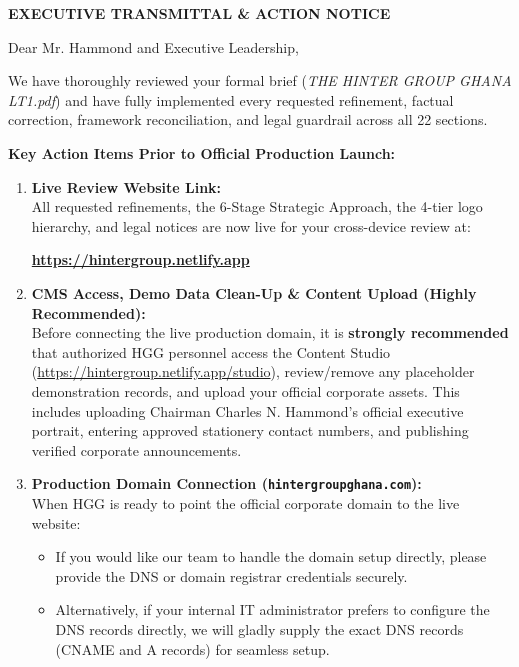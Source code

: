\documentclass[11pt,a4paper]{article}
\begin{document}
\begin{ExecutiveSummaryBox}
\begin{center}
    {\large\bfseries\color{HGGGoldLight}EXECUTIVE TRANSMITTAL \& ACTION NOTICE}
\end{center}
\vspace{0.1cm}
Dear Mr. Hammond and Executive Leadership,

We have thoroughly reviewed your formal brief (\textit{THE HINTER GROUP GHANA LT1.pdf}) and have fully implemented every requested refinement, factual correction, framework reconciliation, and legal guardrail across all 22 sections.

\vspace{0.15cm}
\textbf{\large\color{HGGGoldLight}Key Action Items Prior to Official Production Launch:}
\begin{enumerate}[leftmargin=*,label={\bfseries\color{HGGGoldLight}\arabic*.},itemsep=4pt]
    \item \textbf{Live Review Website Link:} \\
    All requested refinements, the 6-Stage Strategic Approach, the 4-tier logo hierarchy, and legal notices are now live for your cross-device review at:
    \begin{center}
        \textbf{\large\color{white}\url{https://hintergroup.netlify.app}}
    \end{center}
    
    \item \textbf{CMS Access, Demo Data Clean-Up \& Content Upload (Highly Recommended):} \\
    Before connecting the live production domain, it is \textbf{strongly recommended} that authorized HGG personnel access the Content Studio (\url{https://hintergroup.netlify.app/studio}), review/remove any placeholder demonstration records, and upload your official corporate assets. This includes uploading Chairman Charles N. Hammond's official executive portrait, entering approved stationery contact numbers, and publishing verified corporate announcements.
    
    \item \textbf{Production Domain Connection (\texttt{hintergroupghana.com}):} \\
    When HGG is ready to point the official corporate domain to the live website:
    \begin{itemize}[noitemsep]
        \item If you would like our team to handle the domain setup directly, please provide the DNS or domain registrar credentials securely.
        \item Alternatively, if your internal IT administrator prefers to configure the DNS records directly, we will gladly supply the exact DNS records (CNAME and A records) for seamless setup.
    \end{itemize}
\end{enumerate}


\end{ExecutiveSummaryBox}
\end{document}

